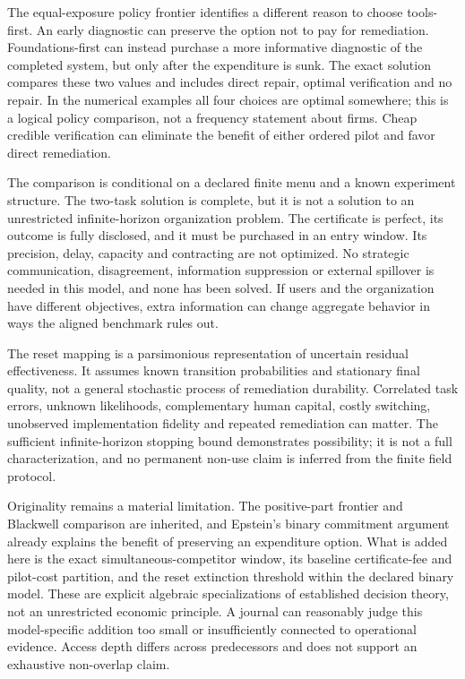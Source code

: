 \documentclass[11pt]{article}
\begin{document}
The equal-exposure policy frontier identifies a different reason to choose tools-first. An early diagnostic can preserve the option not to pay for remediation. Foundations-first can instead purchase a more informative diagnostic of the completed system, but only after the expenditure is sunk. The exact solution compares these two values and includes direct repair, optimal verification and no repair. In the numerical examples all four choices are optimal somewhere; this is a logical policy comparison, not a frequency statement about firms. Cheap credible verification can eliminate the benefit of either ordered pilot and favor direct remediation.

The comparison is conditional on a declared finite menu and a known experiment structure. The two-task solution is complete, but it is not a solution to an unrestricted infinite-horizon organization problem. The certificate is perfect, its outcome is fully disclosed, and it must be purchased in an entry window. Its precision, delay, capacity and contracting are not optimized. No strategic communication, disagreement, information suppression or external spillover is needed in this model, and none has been solved. If users and the organization have different objectives, extra information can change aggregate behavior in ways the aligned benchmark rules out.

The reset mapping is a parsimonious representation of uncertain residual effectiveness. It assumes known transition probabilities and stationary final quality, not a general stochastic process of remediation durability. Correlated task errors, unknown likelihoods, complementary human capital, costly switching, unobserved implementation fidelity and repeated remediation can matter. The sufficient infinite-horizon stopping bound demonstrates possibility; it is not a full characterization, and no permanent non-use claim is inferred from the finite field protocol.

Originality remains a material limitation. The positive-part frontier and Blackwell comparison are inherited, and Epstein's binary commitment argument already explains the benefit of preserving an expenditure option. What is added here is the exact simultaneous-competitor window, its baseline certificate-fee and pilot-cost partition, and the reset extinction threshold within the declared binary model. These are explicit algebraic specializations of established decision theory, not an unrestricted economic principle. A journal can reasonably judge this model-specific addition too small or insufficiently connected to operational evidence. Access depth differs across predecessors and does not support an exhaustive non-overlap claim.
\end{document}
